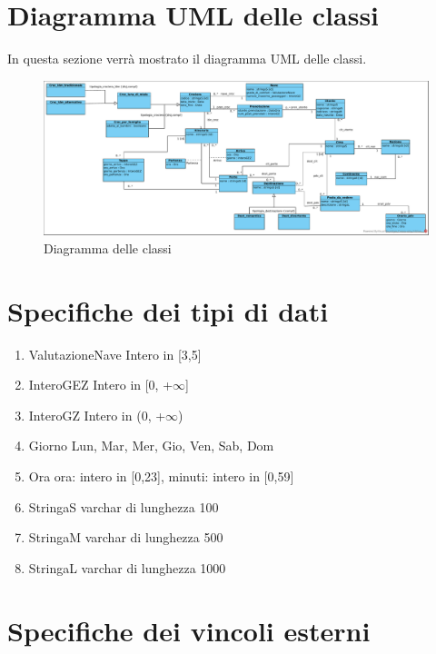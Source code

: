 \documentclass{article}
\begin{document}
\section{Diagramma UML delle classi}

In questa sezione verrà mostrato il diagramma UML delle classi.
\begin{figure}[h]
    \centering
    \includegraphics[width=\textwidth]{../Diagramma delle classi.pdf}
    \caption{Diagramma delle classi}
\end{figure}

\section{Specifiche dei tipi di dati}

\begin{enumerate}
    \item ValutazioneNave Intero in [3,5]
    \item InteroGEZ Intero in [0, +$\infty$]
    \item InteroGZ Intero in (0, +$\infty$)
    \item Giorno {Lun, Mar, Mer, Gio, Ven, Sab, Dom}
    \item Ora {ora: intero in [0,23], minuti: intero in [0,59]}
    \item StringaS varchar di lunghezza 100
    \item StringaM varchar di lunghezza 500
    \item StringaL varchar di lunghezza 1000
\end{enumerate}



\section{Specifiche dei vincoli esterni}
\end{document}

